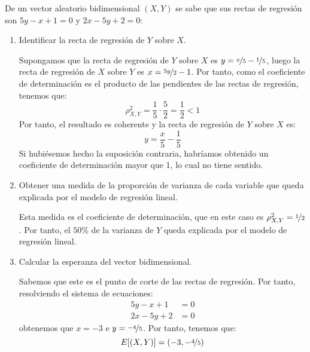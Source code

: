 \documentclass[12pt]{article}
\begin{document}
    \begin{ejercicio}
        De un vector aleatorio bidimensional $(X,Y)$ se sabe que sus rectas de regresión son $5y-x+1=0$ y $2x-5y+2=0$:
        \begin{enumerate}
            \item Identificar la recta de regresión de $Y$ sobre $X$.
            
            Supongamos que la recta de regresión de $Y$ sobre $X$ es $y=\nicefrac{x}{5}-\nicefrac{1}{5}$, luego la recta de regresión de $X$ sobre $Y$ es $x=\nicefrac{5y}{2}-1$. Por tanto, como el coeficiente de determinación es el producto de las pendientes de las rectas de regresión, tenemos que:
            \begin{equation*}
                \rho_{X,Y}^2 = \frac{1}{5}\cdot \frac{5}{2} = \frac{1}{2}<1
            \end{equation*}
            Por tanto, el resultado es coherente y la recta de regresión de $Y$ sobre $X$ es:
            \begin{equation*}
                y=\frac{x}{5}-\frac{1}{5}
            \end{equation*}
            Si hubiésemos hecho la suposición contraria, habríamos obtenido un coeficiente de determinación mayor que 1, lo cual no tiene sentido.
            \item Obtener una medida de la proporción de varianza de cada variable que queda explicada por el modelo de regresión lineal.
            
            Esta medida es el coeficiente de determinación, que en este caso es $\rho_{X,Y}^2=\nicefrac{1}{2}$. Por tanto, el $50\%$ de la varianza de $Y$ queda explicada por el modelo de regresión lineal.
            \item Calcular la esperanza del vector bidimensional.
            
            Sabemos que este es el punto de corte de las rectas de regresión. Por tanto, resolviendo el sistema de ecuaciones:
            \begin{align*}
                5y-x+1 &= 0 \\
                2x-5y+2 &= 0
            \end{align*}
            obtenemos que $x=-3$ e $y=\nicefrac{-4}{5}$. Por tanto, tenemos que:
            \begin{equation*}
                E[(X,Y)] = (-3,-\nicefrac{4}{5})
            \end{equation*}
        \end{enumerate}
    \end{ejercicio}
\end{document}
